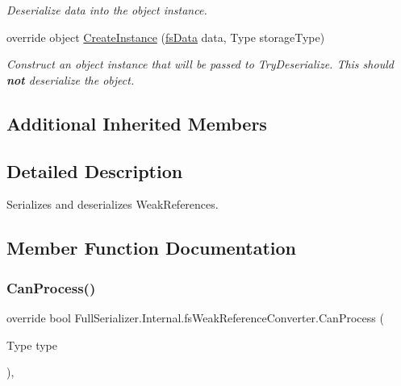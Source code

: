 \begin{DoxyCompactItemize}
\begin{DoxyCompactList}\small\item\em Deserialize data into the object instance. \end{DoxyCompactList}\item 
override object \hyperlink{class_full_serializer_1_1_internal_1_1fs_weak_reference_converter_a8732fca2359367dbf78c687898625406}{Create\+Instance} (\hyperlink{class_full_serializer_1_1fs_data}{fs\+Data} data, Type storage\+Type)
\begin{DoxyCompactList}\small\item\em Construct an object instance that will be passed to Try\+Deserialize. This should {\bfseries not} deserialize the object. \end{DoxyCompactList}\end{DoxyCompactItemize}
\subsection*{Additional Inherited Members}


\subsection{Detailed Description}
Serializes and deserializes Weak\+References. 



\subsection{Member Function Documentation}
\mbox{\label{class_full_serializer_1_1_internal_1_1fs_weak_reference_converter_ac0c327bc319e20e3648e58239ac90888}} 
\subsubsection{\texorpdfstring{Can\+Process()}{CanProcess()}}
{\footnotesize\ttfamily override bool Full\+Serializer.\+Internal.\+fs\+Weak\+Reference\+Converter.\+Can\+Process (\begin{DoxyParamCaption}\item[{Type}]{type }\end{DoxyParamCaption})\hspace{0.3cm}{\ttfamily [inline]}, {\ttfamily [virtual]}}



